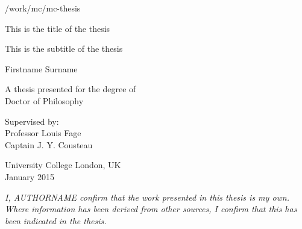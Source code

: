 \documentclass[12pt,a4paper,]{report}
\begin{document}
\begin{titlepage}
    \begin{center}

/work/mc/mc-thesis
        \vspace*{2.5cm}

        \huge
        This is the title of the thesis

                \vspace{.5cm}

        \Large
        This is the subtitle of the thesis
        

        \vspace{1.5cm}

        \Large
        Firstname Surname

        \vspace{1.5cm}

        \normalsize
        A thesis presented for the degree of\\
        Doctor of Philosophy

        \vfill

        \normalsize
        Supervised by:\\
        Professor Louis Fage \\ Captain J. Y. Cousteau

        \vspace{0.8cm}


        \normalsize
        University College London, UK\\
        January 2015


    \end{center}
\end{titlepage}


\vspace*{\fill}

\noindent \textit{
I, AUTHORNAME confirm that the work presented in this thesis is my own. Where information has been derived from other sources, I confirm that this has been indicated in the thesis.
} \vspace*{\fill}  \newpage
\end{document}
